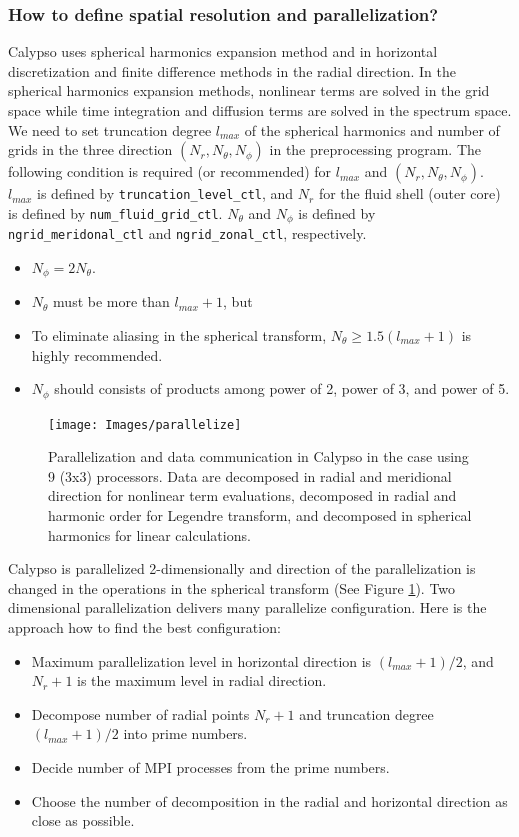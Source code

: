 \subsubsection{How to define spatial resolution and parallelization?}
  Calypso uses spherical harmonics expansion method and in horizontal discretization and finite difference methods in the radial direction. In the spherical harmonics expansion methods, nonlinear terms are solved in the grid space while time integration and diffusion terms are solved in the spectrum space. We need to set truncation degree $l_{max}$ of the spherical harmonics and number of grids in the three direction $(N_{r}, N_{\theta}, N_{\phi})$ in the preprocessing program. The following condition is required (or recommended) for $l_{max}$ and $(N_{r}, N_{\theta}, N_{\phi})$. $l_{max}$ is defined by \verb|truncation_level_ctl|, and $N_{r}$ for the fluid shell (outer core) is defined by  \verb|num_fluid_grid_ctl|.  $N_{\theta}$ and $N_{\phi}$ is defined by \verb|ngrid_meridonal_ctl| and \verb|ngrid_zonal_ctl|, respectively.
%
\begin{itemize}
\item $N_{\phi} = 2 N_{\theta}$.
\item $N_{\theta}$ must be more than $l_{max}+1$, but
\item To eliminate aliasing in the spherical transform, $N_{\theta} \ge 1.5 \left( l_{max}+1 \right)$ is highly recommended.
\item $N_{\phi}$ should consists of products among power of 2, power of 3, and power of 5.
\end{itemize}
%
%
\begin{figure}[htbp]
\begin{center}
\texttt{[image: Images/parallelize]}
\end{center}
\caption{Parallelization and data communication in Calypso in the case using 9 (3x3) processors. Data are decomposed in radial and meridional direction for nonlinear term evaluations, decomposed in radial and harmonic order for Legendre transform, and decomposed in spherical harmonics for linear calculations.}
\label{fig:parallelization}
\end{figure}
%
Calypso is parallelized 2-dimensionally and direction of the parallelization is changed in the operations in the spherical transform (See Figure \ref{fig:parallelization}). Two dimensional parallelization delivers many parallelize configuration. Here is the approach  how to find the best configuration:
%
\begin{itemize}
\item Maximum parallelization level in horizontal direction is $\left( l_{max} + 1 \right)  /2$,  and $N_{r}+1$ is the maximum level in radial direction.
\item Decompose number of radial points $N_{r}+1$ and truncation degree $\left( l_{max} + 1 \right) / 2 $ into prime numbers.
\item Decide number of MPI processes from the prime numbers.
\item Choose the number of decomposition in the radial and horizontal direction as close as possible.
\end{itemize}
